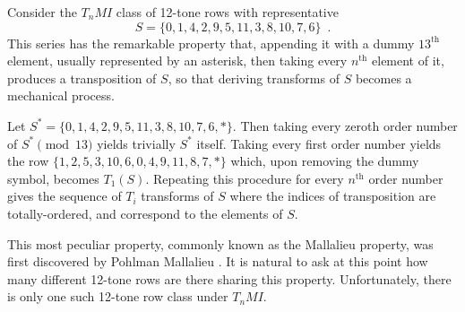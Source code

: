 Consider the $T_nMI$ class of 12-tone rows with representative
\begin{equation}
	S = \{ 0, 1, 4, 2, 9, 5, 11, 3, 8, 10, 7, 6 \} \enspace.
\end{equation}
This series has the remarkable property that, appending it with a dummy $13^\text{th}$ element, usually represented by an asterisk, then taking every $n^\text{th}$ element of it, produces a transposition of $S$, so that deriving transforms of $S$ becomes a mechanical process.

\begin{example}
	Let $S^* = \{ 0, 1, 4, 2, 9, 5, 11, 3, 8, 10, 7, 6, * \}$. Then taking every zeroth order number of $S^* \pmod{13}$ yields trivially $S^*$ itself. Taking every first order number yields the row $\{ 1, 2, 5, 3, 10, 6, 0, 4, 9, 11, 8, 7, * \}$ which, upon removing the dummy symbol, becomes $T_1(S)$. Repeating this procedure for every $n^\text{th}$ order number gives the sequence of $T_i$ transforms of $S$ where the indices of transposition are totally-ordered, and correspond to the elements of $S$.
\end{example}

This most peculiar property, commonly known as the Mallalieu property, was first discovered by Pohlman Mallalieu \cite[285]{Lewin1966}. It is natural to ask at this point how many different 12-tone rows are there sharing this property. Unfortunately, there is only one such 12-tone row class under $T_nMI$.

